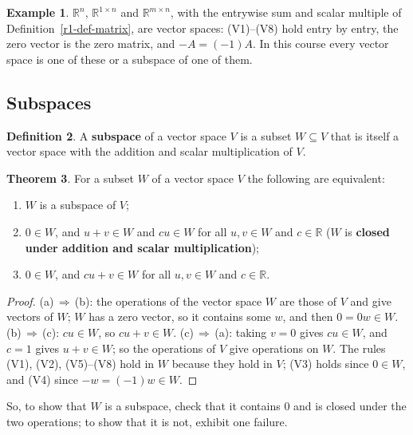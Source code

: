 \documentclass[12pt]{article}
\newcommand{\R}{\mathbb R}
\theoremstyle{definition}
\newtheorem{theorem}{Theorem}
\newtheorem{definition}[theorem]{Definition}
\newtheorem{example}[theorem]{Example}
\begin{document}
\begin{example}\label{r3-exm-spaces}
\(\R^n\), \(\R^{1\times n}\) and \(\R^{m\times n}\), with the entrywise sum and scalar multiple
of Definition~\ref{r1-def-matrix}, are vector spaces: (V1)--(V8) hold entry by entry, the zero vector is the zero
matrix, and \(-A=(-1)A\). In this course every vector space is one of these or a subspace of
one of them.
\end{example}

\subsection*{Subspaces}

\begin{definition}\label{r3-def-subspace}
A \textbf{subspace} of a vector space \(V\) is a subset \(W\subseteq V\) that is itself a
vector space with the addition and scalar multiplication of \(V\).
\end{definition}

\begin{theorem}\label{r3-thm-subspace-test}
For a subset \(W\) of a vector space \(V\) the following are equivalent:
\begin{enumerate}
\item \(W\) is a subspace of \(V\);
\item \(0\in W\), and \(u+v\in W\) and \(cu\in W\) for all \(u,v\in W\) and \(c\in\R\)
(\(W\) is \textbf{closed under addition and scalar multiplication});
\item \(0\in W\), and \(cu+v\in W\) for all \(u,v\in W\) and \(c\in\R\).
\end{enumerate}
\end{theorem}
\begin{proof}
(a)\,\(\Rightarrow\)\,(b): the operations of the vector space \(W\) are those of \(V\) and give
vectors of \(W\); \(W\) has a zero vector, so it contains some \(w\), and then
\(0=0w\in W\). (b)\,\(\Rightarrow\)\,(c): \(cu\in W\), so \(cu+v\in W\).
(c)\,\(\Rightarrow\)\,(a): taking \(v=0\) gives \(cu\in W\), and \(c=1\) gives \(u+v\in W\);
so the operations of \(V\) give operations on \(W\). The rules (V1), (V2), (V5)--(V8) hold in
\(W\) because they hold in \(V\); (V3) holds since \(0\in W\), and (V4) since
\(-w=(-1)w\in W\).
\end{proof}
So, to show that \(W\) is a subspace, check that it contains \(0\) and is closed under the two
operations; to show that it is not, exhibit one failure.
\end{document}
